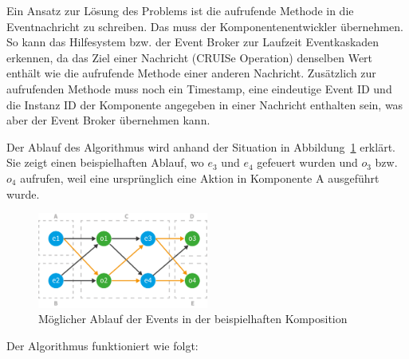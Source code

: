 \documentclass[
	headsepline,
	footsepline,
	fontsize=12pt,
	bibliography=totoc
]{scrbook}
\begin{document}
Ein Ansatz zur Lösung des Problems ist die aufrufende Methode in die Eventnachricht zu schreiben. Das muss der Komponentenentwickler übernehmen. So kann das Hilfesystem bzw. der Event Broker zur Laufzeit Eventkaskaden erkennen, da das Ziel einer Nachricht (CRUISe Operation) denselben Wert enthält wie die aufrufende Methode einer anderen Nachricht. Zusätzlich zur aufrufenden Methode muss noch ein Timestamp, eine eindeutige Event ID und die Instanz ID der Komponente angegeben in einer Nachricht enthalten sein, was aber der Event Broker übernehmen kann.


Der Ablauf des Algorithmus wird anhand der Situation in Abbildung~\ref{figure:dependency-graph} erklärt. Sie zeigt einen beispielhaften Ablauf, wo $e_3$ und $e_4$ gefeuert wurden und $o_3$ bzw. $o_4$ aufrufen, weil eine ursprünglich eine Aktion in Komponente A ausgeführt wurde.

\begin{figure}[htbp]
   \centering
   \includegraphics[width=0.5\textwidth]{images/konzeption-dependency-graph.png}
   \caption{Möglicher Ablauf der Events in der beispielhaften Komposition}
   \label{figure:dependency-graph}
\end{figure}

Der Algorithmus funktioniert wie folgt:
\end{document}
